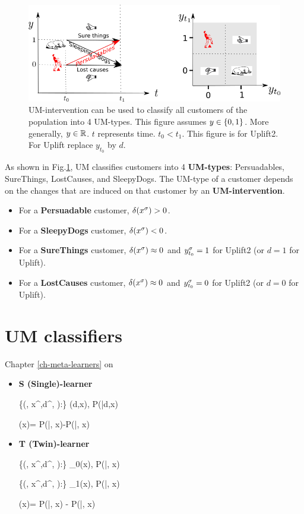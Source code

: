 \begin{figure}[h!]
\centering
\includegraphics[width=6in]
{uplift/uplift-y-t-up.png}
\caption{UM-intervention
can be used to classify
all customers of the
population into 4 UM-types.
This figure 
assumes $y\in \{0,1\}$.
More generally, $y\in { \mathbb{R}}$.
$t$ represents time. $t_0< t_1$.
This figure is for Uplift2. 
For Uplift replace $y_{t_0}$ by $d$.} 
\label{fig-uplift-y-t}
\end{figure}

As shown
in Fig.\ref{fig-uplift-y-t},
UM classifies customers
into 4 {\bf UM-types}: Persuadables, SureThings, LostCauses,
and SleepyDogs.
The UM-type
of a customer
depends on the changes 
that are induced on that customer
by an {\bf UM-intervention}.
\begin{itemize}
\item
For a {\bf Persuadable} customer,
$\delta(x^\sigma)>0$.
\item
For a {\bf SleepyDogs}
customer, $\delta(x^\sigma)< 0$.
\item
For a {\bf SureThings} customer,
 $\delta(x^\sigma)\approx 0$
and $y^\sigma_{t_0}=1$ for Uplift2
 (or $d=1$ for
Uplift).
\item
For a {\bf LostCauses} customer,
$\delta(x^\sigma)\approx 0$
and $y^\sigma_{t_0}=0$ for Uplift2
 (or $d=0$ for
Uplift).
\end{itemize}

\section{UM classifiers}
Chapter \ref{ch-meta-learners} on 

\begin{itemize}
\item {\bf S (Single)-learner}

\beq
\{(\s, x^\s,d^\s,  ):\s\in \Sigma\}
\mlarr \haty(d,x), P(|d,x)
\eeq

\beq
\delta(x)= P(|, x)-P(|, x)
\eeq

\item {\bf T (Twin)-learner}

\beq
\{(\s, x^\s,d^,  ):\s\in \Sigma\}
\mlarr \haty_0(x), P(|, x)
\eeq

\beq
\{(\s, x^\s,d^,  ):\s\in \Sigma\}
\mlarr \haty_1(x), P(|, x)
\eeq

\beq
\delta(x)= P(|, x)
- P(|, x)
\eeq
\end{itemize}

